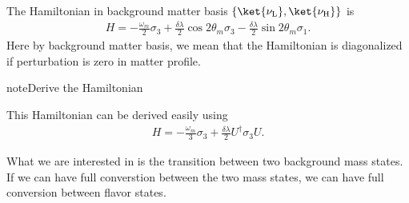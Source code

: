 \documentclass[letterpaper,12pt,english]{sphinxmanual}
\begin{document}
The Hamiltonian in background matter basis \(\{\ket{\nu_{\mathrm{L}}},\ket{\nu_{\mathrm{H}}}\}\) is
\begin{equation*}
\begin{split}H = - \frac{\omega_m}{2} \sigma_3 + \frac{\delta \lambda}{2} \cos 2\theta_m \sigma_3 - \frac{\delta \lambda}{2} \sin 2 \theta_m \sigma_1.\end{split}
\end{equation*}
Here by background matter basis, we mean that the Hamiltonian is diagonalized if perturbation is zero in matter profile.

\begin{sphinxadmonition}{note}{Derive the Hamiltonian}

This Hamiltonian can be derived easily using
\begin{equation*}
\begin{split}H = -\frac{\omega_m}{3}\sigma_3 + \frac{\delta \lambda}{2} U^\dagger \sigma_3 U.\end{split}
\end{equation*}\end{sphinxadmonition}

What we are interested in is the transition between two background mass states. If we can have full converstion between the two mass states, we can have full conversion between flavor states.

\end{document}
